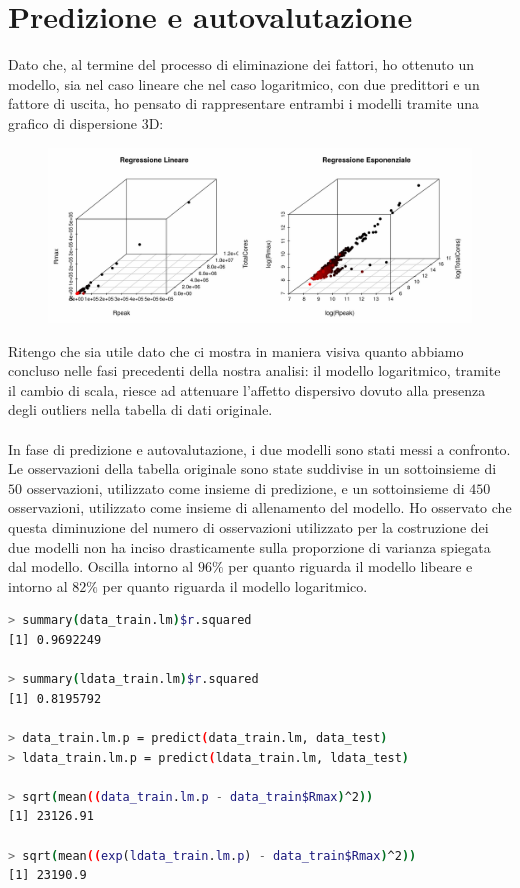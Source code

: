 \documentclass[11pt,a4paper]{article}
\begin{document}
\section{Predizione e autovalutazione}
Dato che, al termine del processo di eliminazione dei fattori, ho ottenuto un
modello, sia nel caso lineare che nel caso logaritmico, con due predittori e un
fattore di uscita, ho pensato di rappresentare entrambi i modelli tramite una
grafico di dispersione 3D:
\clearpage
\begin{figure}[H]
	\begin{center}
		\vspace{-1.0cm}
		\hspace*{-2.7cm}
		\includegraphics[scale=0.7]{imgs/scatterplot_3d.pdf}
		\vspace{-1cm}
	\end{center}
\end{figure}
\noindent
Ritengo che sia utile dato che ci mostra in maniera visiva quanto abbiamo
concluso nelle fasi precedenti della nostra analisi: il modello logaritmico,
tramite il cambio di scala, riesce ad attenuare l'affetto dispersivo dovuto
alla presenza degli outliers nella tabella di dati originale.\\
\\
In fase di predizione e autovalutazione, i due modelli sono stati messi a
confronto. Le osservazioni della tabella originale sono state suddivise in un
sottoinsieme di $50$ osservazioni, utilizzato come insieme di predizione, e un
sottoinsieme di $450$ osservazioni, utilizzato come insieme di allenamento del
modello. Ho osservato che questa diminuzione del numero di osservazioni
utilizzato per la costruzione dei due modelli non ha inciso drasticamente sulla
proporzione di varianza spiegata dal modello. Oscilla intorno al $96\%$ per
quanto riguarda il modello libeare e intorno al $82\%$ per quanto riguarda il
modello logaritmico.
\begin{lstlisting}[language=bash,basicstyle=\tiny,tabsize=2,frame = single]
> summary(data_train.lm)$r.squared
[1] 0.9692249

> summary(ldata_train.lm)$r.squared
[1] 0.8195792

> data_train.lm.p = predict(data_train.lm, data_test)
> ldata_train.lm.p = predict(ldata_train.lm, ldata_test)

> sqrt(mean((data_train.lm.p - data_train$Rmax)^2))
[1] 23126.91

> sqrt(mean((exp(ldata_train.lm.p) - data_train$Rmax)^2))
[1] 23190.9
\end{lstlisting}
\end{document}
